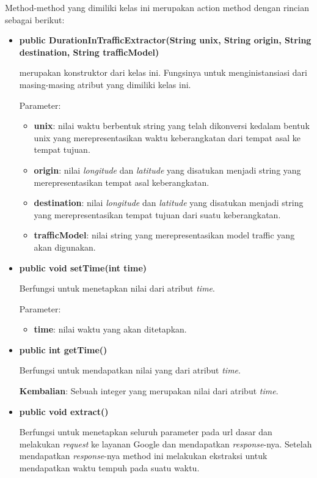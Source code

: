 \begin{enumerate}
	Method-method yang dimiliki kelas ini merupakan action method dengan rincian sebagai berikut:
	
	\begin{itemize}
		\item \textbf{public DurationInTrafficExtractor(String unix, String origin, String destination, String trafficModel)} 
		
		merupakan konstruktor dari kelas ini. Fungsinya untuk menginistansiasi dari masing-masing atribut yang dimiliki kelas ini.
		
		Parameter:
	\begin{itemize}
		\item \textbf{unix}: nilai waktu berbentuk string yang telah dikonversi kedalam bentuk unix yang merepresentasikan waktu keberangkatan dari tempat asal ke tempat tujuan.
		\item \textbf{origin}: nilai \textit{longitude} dan \textit{latitude} yang disatukan menjadi string yang merepresentasikan tempat asal keberangkatan.
		\item \textbf{destination}: nilai \textit{longitude} dan \textit{latitude} yang disatukan menjadi string yang merepresentasikan tempat tujuan dari suatu keberangkatan.
		\item \textbf{trafficModel}: nilai string yang merepresentasikan model traffic yang akan digunakan.
	\end{itemize}
		
		\item \textbf{public void setTime(int time)}
		
		Berfungsi untuk menetapkan nilai dari atribut \textit{time}.
		
		Parameter:
	\begin{itemize}
		\item \textbf{time}: nilai waktu yang akan ditetapkan.
	\end{itemize}
	
		\item \textbf{public int getTime()} 
		
		Berfungsi untuk mendapatkan nilai yang dari atribut \textit{time}.
		
	\textbf{Kembalian}: Sebuah integer yang merupakan nilai dari atribut \textit{time}.
	
		\item \textbf{public void extract()} 
		
		Berfungsi untuk menetapkan seluruh parameter pada url dasar dan melakukan \textit{request} ke layanan Google dan mendapatkan \textit{response}-nya. Setelah mendapatkan \textit{response}-nya method ini melakukan ekstraksi untuk mendapatkan waktu tempuh pada suatu waktu.
		

\end{itemize}
\end{enumerate}
